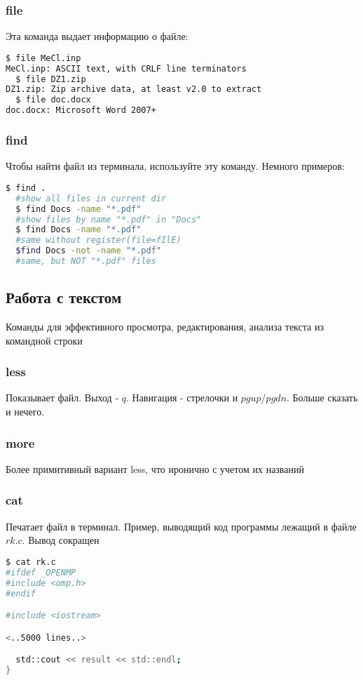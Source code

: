 \documentclass[11pt]{article}
\begin{document}
\subsubsection{file}
Эта команда выдает информацию о файле:
\begin{lstlisting}[language=bash]
  $ file MeCl.inp 
MeCl.inp: ASCII text, with CRLF line terminators
  $ file DZ1.zip 
DZ1.zip: Zip archive data, at least v2.0 to extract
  $ file doc.docx 
doc.docx: Microsoft Word 2007+
\end{lstlisting}

\subsubsection{find}

Чтобы найти файл из терминала, используйте эту команду. Немного примеров:
\begin{lstlisting}[language=bash]
  $ find .                    
  #show all files in current dir
  $ find Docs -name "*.pdf"   
  #show files by name "*.pdf" in "Docs"
  $ find Docs -name "*.pdf"   
  #same without register(file=fIlE)
  $find Docs -not -name "*.pdf"   
  #same, but NOT "*.pdf" files
\end{lstlisting}


\subsection{Работа с текстом}
Команды для эффективного просмотра, редактирования, анализа текста из командной строки
\subsubsection{less}
Показывает файл. Выход - $q$. Навигация - стрелочки и $pg up$/$pg dn$. Больше сказать и нечего.

\subsubsection{more}
Более примитивный вариант less, что иронично с учетом их названий
\subsubsection{cat}
Печатает файл в терминал. Пример, выводящий код программы лежащий в файле $rk.c$. Вывод сокращен
\begin{lstlisting}[language=bash]
$ cat rk.c
#ifdef _OPENMP
#include <omp.h>
#endif

#include <iostream>

<..5000 lines..>

  std::cout << result << std::endl;
}
\end{lstlisting}
\end{document}
